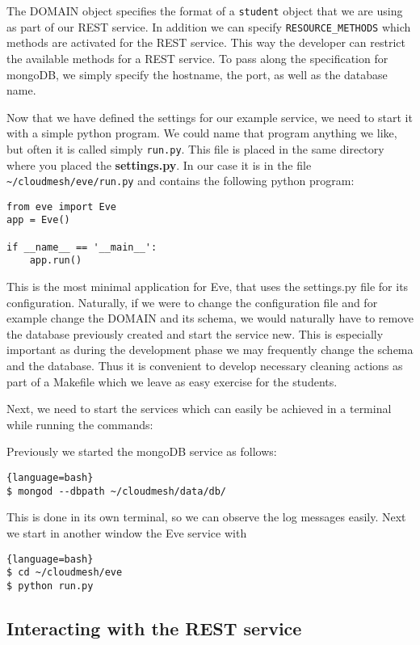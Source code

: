 The DOMAIN object specifies the format of a \verb|student| object that
we are using as part of our REST service.  In addition we can specify
\verb|RESOURCE_METHODS| which methods are activated for the REST
service. This way the developer can restrict the available methods for
a REST service. To pass along the specification for mongoDB, we simply
specify the hostname, the port, as well as the database name.

Now that we have defined the settings for our example service, we need
to start it with a simple python program. We could name that program
anything we like, but often it is called simply \verb|run.py|. This
file is placed in the same directory where you placed the
\textbf{settings.py}. In our case it is in the file
\verb|~/cloudmesh/eve/run.py| and contains the following python
program:

\begin{lstlisting}
from eve import Eve
app = Eve()

if __name__ == '__main__':
    app.run()
\end{lstlisting}

This is the most minimal application for Eve, that uses the
settings.py file for its configuration. Naturally, if we were to
change the configuration file and for example change the DOMAIN and
its schema, we would naturally have to remove the database previously
created and start the service new. This is especially important as
during the development phase we may frequently change the schema and
the database. Thus it is convenient to develop necessary cleaning
actions as part of a Makefile which we leave as easy exercise for the
students.

Next, we need to start the services which can easily be achieved in a
terminal while running the commands:

Previously we started the mongoDB service as follows:

\begin{lstlisting}{language=bash}
$ mongod --dbpath ~/cloudmesh/data/db/
\end{lstlisting}

This is done in its own terminal, so we can observe the log messages easily.
Next we start in another window the Eve service with 

\begin{lstlisting}{language=bash}
$ cd ~/cloudmesh/eve
$ python run.py
\end{lstlisting}


\subsection{Interacting with the REST service}

